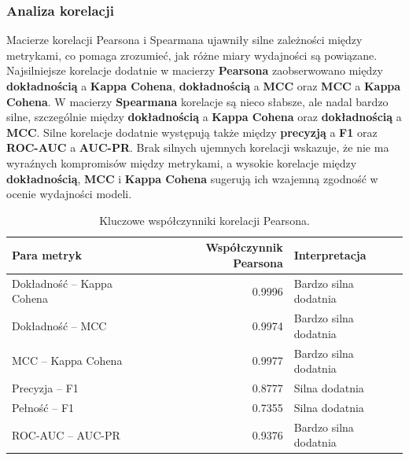 \subsubsection{Analiza korelacji}

Macierze korelacji Pearsona i Spearmana ujawniły silne zależności między metrykami, co pomaga zrozumieć, jak różne miary wydajności są powiązane. Najsilniejsze korelacje dodatnie w macierzy \textbf{Pearsona} zaobserwowano między \textbf{dokładnością} a \textbf{Kappa Cohena}, \textbf{dokładnością} a \textbf{MCC} oraz \textbf{MCC} a \textbf{Kappa Cohena}. W macierzy \textbf{Spearmana} korelacje są nieco słabsze, ale nadal bardzo silne, szczególnie między \textbf{dokładnością} a \textbf{Kappa Cohena} oraz \textbf{dokładnością} a \textbf{MCC}. Silne korelacje dodatnie występują także między \textbf{precyzją} a \textbf{F1} oraz \textbf{ROC-AUC} a \textbf{AUC-PR}. Brak silnych ujemnych korelacji wskazuje, że nie ma wyraźnych kompromisów między metrykami, a wysokie korelacje między \textbf{dokładnością}, \textbf{MCC} i \textbf{Kappa Cohena} sugerują ich wzajemną zgodność w ocenie wydajności modeli.

\begin{table}[H]
	\centering
	\caption{Kluczowe współczynniki korelacji Pearsona.}
	\label{tab:buzzfeed_pearson_correlations}
	\begin{tabular}{l r l}
		\toprule
		\textbf{Para metryk}       & \textbf{Współczynnik Pearsona} & \textbf{Interpretacja} \\
		\midrule
		Dokładność -- Kappa Cohena & 0.9996                         & Bardzo silna dodatnia  \\
		Dokładność -- MCC          & 0.9974                         & Bardzo silna dodatnia  \\
		MCC -- Kappa Cohena        & 0.9977                         & Bardzo silna dodatnia  \\
		Precyzja -- F1             & 0.8777                         & Silna dodatnia         \\
		Pełność -- F1              & 0.7355                         & Silna dodatnia         \\
		ROC-AUC -- AUC-PR          & 0.9376                         & Bardzo silna dodatnia  \\
		\bottomrule
	\end{tabular}
\end{table}

